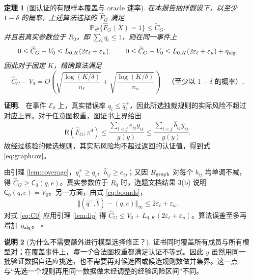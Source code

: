 \documentclass[11pt,a4paper]{ctexart}
\newtheorem{theorem}{定理}[section]
\theoremstyle{definition}
\newtheorem{remark}[theorem]{说明}
\newenvironment{proofcn}{\par\noindent\textbf{证明.}\ }{\hfill$\square$\par}
\newcommand{\Rsk}{\mathsf R}
\newcommand{\CGraph}{\mathsf C_0}
\newcommand{\Pp}{\mathbb P}
\newcommand{\epsl}{\varepsilon_{\ell}}
\newcommand{\epsu}{\varepsilon_u}
\newcommand{\hC}{\widehat C}
\begin{document}
\begin{theorem}[图认证的有限样本覆盖与 oracle 速率]\label{thm:graph}
在本报告抽样假设下，以至少 $1-\delta$ 的概率，上述算法选择的 $\hat F_G$ 满足
\begin{equation}\label{eq:graphcov}
\Pp_{\pi^0}\{\hat F_G(X)=1\}\le\widetilde C_G.
\end{equation}
并且若真实参数位于 $R_0$，即 $\sum_iq_i\le1$，则在同一事件上
\begin{equation}\label{eq:graphgap}
0\le\hC_G-V_0\le L_{0,K}(2\epsl+\epsu),\qquad
0\le\widetilde C_G-V_0\le L_{0,K}(2\epsl+\epsu)+\eta_{\rm alg}.
\end{equation}
因此对于固定 $K$，精确算法满足
\[
\hC_G-V_0=O\!\left(\sqrt{\frac{\log(K/\delta)}{n_\ell}}+\sqrt{\frac{\log(K/\delta)}{n_u}}\right)
\quad\text{（至少以 $1-\delta$ 的概率）}.
\]
\end{theorem}
\begin{proofcn}
在事件 $\mathcal E_\delta$ 上，真实错误率 $q_i\le\hat q_i^+$，因此所选独裁规则的实际风险不超过对应上界。对于任意图权重，图证书上界给出
\[\Rsk(\hat F_G;\pi^0)\le\frac{\sum_{i<j}e_{ij}y_{ij}}{g(y)}\le\frac{\sum_{i<j}\hat b_{ij}y_{ij}}{g(y)}.\]
故经过核验的候选规则，其实际风险均不超过返回的认证值，得到式 \eqref{eq:graphcov}。

由引理 \ref{lem:coverage}，$\hat q_i^+\ge q_i$，$\hat b_{ij}\ge e_{ij}$；又因 $B_{\rm graph}$ 对每个 $b_{ij}$ 均单调不减，得 $\hC_G\ge\CGraph(q,e)$。真实参数位于 $R_0$ 时，选题文档结果 3(b) 说明 $\CGraph(q,e)=V_0$。另一方面，由式 \eqref{eq:bounds}，
\[
\Vert(\hat q^+,\hat b)-(q,e)\Vert_\infty\le2\epsl+\epsu.
\]
对式 \eqref{eq:C0} 应用引理 \ref{lem:lip} 得 $\hC_G\le V_0+L_{0,K}(2\epsl+\epsu)$。算法误差至多再增加 $\eta_{\rm alg}$。
\end{proofcn}

\begin{remark}[为什么不需要额外进行模型选择修正？]
证书同时覆盖所有成员与所有模型对；在覆盖事件上，\emph{每一个}合法图权重都满足认证不等式。因此 $y$ 虽然用同一批验证数据自适应挑选，也不需要再对候选图或候选规则数做并集界。这一点与“先选一个规则再用同一数据做未经调整的经验风险区间”不同。
\end{remark}
\end{document}
